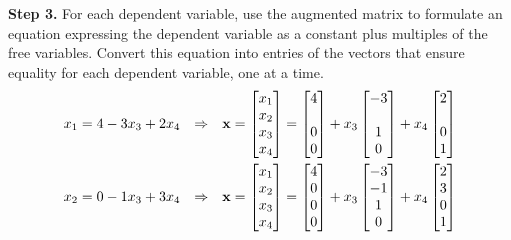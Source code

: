 \documentclass{ximera}
\begin{document}
\begin{example}
  \textbf{Step 3.}  For each dependent variable, use the augmented
  matrix to formulate an equation expressing the dependent variable as
  a constant plus multiples of the free variables.  Convert this
  equation into entries of the vectors that ensure equality for each
  dependent variable, one at a time.
  \begin{align*}
    x_1=4-3x_3+2x_4&&\Rightarrow&&
                                   \vect{x}=\colvector{x_1\\x_2\\x_3\\x_4}=
    \colvector{4\\\ \\0\\0}+x_3\colvector{-3\\\ \\1\\0}+x_4\colvector{2\\\ \\0\\1}\\
    x_2=0-1x_3+3x_4&&\Rightarrow&&
                                   \vect{x}=\colvector{x_1\\x_2\\x_3\\x_4}=
    \colvector{4\\0\\0\\0}+x_3\colvector{-3\\-1\\1\\0}+x_4\colvector{2\\3\\0\\1}
  \end{align*}


\end{example}
\end{document}
